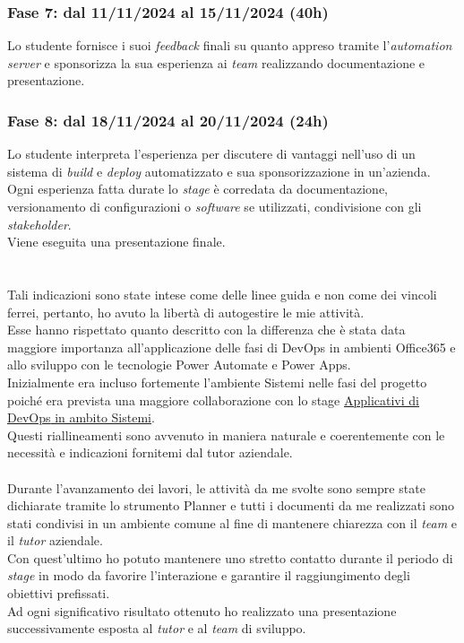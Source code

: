\subsubsection*{Fase 7: dal 11/11/2024 al 15/11/2024 (40h) }
Lo studente fornisce i suoi \emph{feedback} finali su quanto appreso tramite l'\emph{automation server} e sponsorizza la sua esperienza ai \emph{team} realizzando documentazione e presentazione.\\

\subsubsection*{Fase 8: dal 18/11/2024 al 20/11/2024 (24h) }
Lo studente interpreta l'esperienza per discutere di vantaggi nell'uso di un sistema di \emph{build} e \emph{deploy} automatizzato e sua sponsorizzazione in un'azienda. Ogni esperienza fatta durate lo \emph{stage} è corredata da documentazione, versionamento di configurazioni o \emph{software} se utilizzati, condivisione con gli \emph{stakeholder}.\\
Viene eseguita una presentazione finale.\\\\\\
Tali indicazioni sono state intese come delle linee guida e non come dei vincoli ferrei, pertanto, ho avuto la libertà di autogestire le mie attività.\\
Esse hanno rispettato quanto descritto con la differenza che è stata data maggiore importanza all'applicazione delle fasi di \gls{DevOps} in ambienti Office365 e allo sviluppo con le tecnologie Power Automate e Power Apps.\\
Inizialmente era incluso fortemente l'ambiente \gls{Sistemi} nelle fasi del progetto poiché era prevista una maggiore collaborazione con lo stage \hyperref[stageDavide]{Applicativi di \gls{DevOps} in ambito Sistemi}.\\
Questi riallineamenti sono avvenuto in maniera naturale e coerentemente con le necessità e indicazioni fornitemi dal tutor aziendale.\\\\
Durante l'avanzamento dei lavori, le attività da me svolte sono sempre state dichiarate tramite lo strumento Planner e tutti i documenti da me realizzati sono stati condivisi in un ambiente comune al fine di mantenere chiarezza con il \emph{team} e il \emph{tutor} aziendale.\\
Con quest'ultimo ho potuto mantenere uno stretto contatto durante il periodo di \emph{stage} in modo da favorire l'interazione e garantire il raggiungimento degli obiettivi prefissati.\\
Ad ogni significativo risultato ottenuto ho realizzato una presentazione successivamente esposta al \emph{tutor} e al \emph{team} di sviluppo.\\

